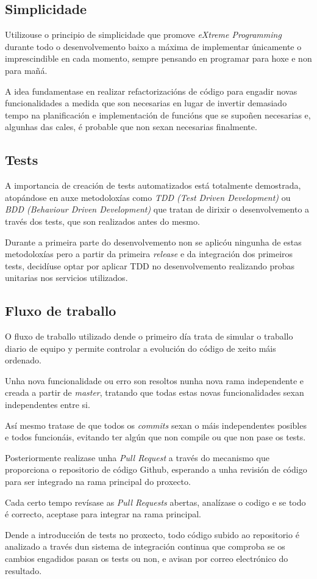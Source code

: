     \subsection{Simplicidade}
    Utilizouse o principio de simplicidade que promove \emph{eXtreme 
Programming} durante todo o desenvolvemento baixo a máxima de implementar 
únicamente o imprescindible en cada momento, sempre pensando en programar para 
hoxe e non para mañá.

    A idea fundamentase en realizar refactorizacións de código para engadir 
novas funcionalidades a medida que son necesarias en lugar de invertir 
demasiado tempo na planificación e implementación de funcións que se supoñen 
necesarias e, algunhas das cales, é probable que non sexan necesarias 
finalmente.

    \subsection{Tests}
    A importancia de creación de tests automatizados está totalmente 
demostrada, atopándose en auxe metodoloxías como \emph{TDD (Test Driven 
Development)} ou \emph{BDD (Behaviour Driven Development)} que tratan de 
dirixir o desenvolvemento a través dos tests, que son realizados antes do mesmo.
    
    Durante a primeira parte do desenvolvemento non se aplicóu ningunha de 
estas metodoloxías pero a partir da primeira \emph{release} e da integración 
dos primeiros tests, decidíuse optar por aplicar TDD no desenvolvemento 
realizando probas unitarias nos servicios utilizados.

    \subsection{Fluxo de traballo}
    O fluxo de traballo utilizado dende o primeiro día trata de simular o 
traballo diario de equipo y permite controlar a evolución do código de xeito 
máis ordenado.
    
    Unha nova funcionalidade ou erro son resoltos nunha nova rama 
independente e creada a partir de \emph{master}, tratando que todas estas novas 
funcionalidades sexan independentes entre si.

    Así mesmo tratase de que todos os \emph{commits} sexan o máis independentes 
posibles e todos funcionáis, evitando ter algún que non compile ou que non pase 
os tests.

    Posteriormente realizase unha \emph{Pull Request} a través do mecanismo que 
proporciona o repositorio de código Github, esperando a unha revisión de código 
para ser integrado na rama principal do proxecto.

    Cada certo tempo revísase as \emph{Pull Requests} abertas, analízase o 
codigo e se todo é correcto, aceptase para integrar na rama principal.

    Dende a introducción de tests no proxecto, todo código subido ao 
repositorio é analizado a través dun sistema de integración continua que 
comproba se os cambios engadidos pasan os tests ou non, e avisan por correo 
electrónico do resultado.
